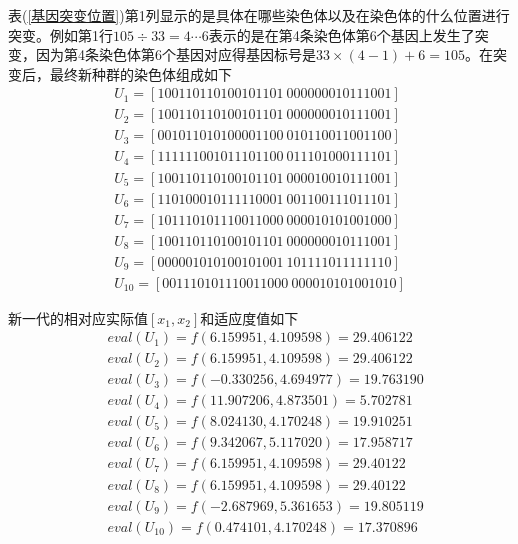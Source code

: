             表(\ref{基因突变位置})第1列显示的是具体在哪些染色体以及在染色体的什么位置进行突变。例如第1行$105 \div 33=4\cdots 6$表示的是在第4条染色体第6个基因上发生了突变，因为第4条染色体第6个基因对应得基因标号是$33\times (4-1) + 6 = 105$。在突变后，最终新种群的染色体组成如下
            \begin{align*}
            U_1 = [100110110100101101\ 000000010111001]\\
            U_2 = [100110110100101101\ 000000010111001]\\
            U_3 = [001011010100001100\ 010110011001100]\\
            U_4 = [111111001011101100\ 011101000111101]\\
            U_5 = [100110110100101101\ 000010010111001]\\
            U_6 = [110100010111110001\ 001100111011101]\\
            U_7 = [101110101110011000\ 000010101001000]\\
            U_8 = [100110110100101101\ 000000010111001]\\
            U_9 = [000001010100101001\ 101111011111110]\\
            U_{10} = [001110101110011000\ 000010101001010]
            \end{align*}
            \par
            新一代的相对应实际值$[x_1,x_2]$和适应度值如下
            \begin{align*}
            & eval(U_1) = f(6.159951,4.109598) = 29.406122\\
            & eval(U_2) = f(6.159951,4.109598) = 29.406122\\
            & eval(U_3) = f(-0.330256,4.694977) = 19.763190\\
            & eval(U_4) = f(11.907206,4.873501) = 5.702781\\
            & eval(U_5) = f(8.024130,4.170248) = 19.910251\\
            & eval(U_6) = f(9.342067,5.117020) = 17.958717\\
            & eval(U_7) = f(6.159951,4.109598) = 29.40122\\
            & eval(U_8) = f(6.159951,4.109598) = 29.40122\\
            & eval(U_9) = f(-2.687969,5.361653) = 19.805119\\
            & eval(U_{10}) = f(0.474101,4.170248) = 17.370896\\
            \end{align*}

